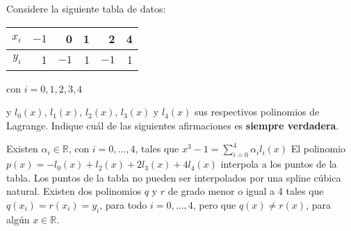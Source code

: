 \begin{pregunta}
\begin{cuerpo}
Considere la siguiente tabla de datos:

\bigskip
\begin{center}
\begin{tabular}{r||r|r|r|r|r}
$x_i$&$-1$&0&1&2&4\\
\hline
$y_i$&1&$-1$&1&$-1$&1
\end{tabular}
\qquad con $i=0,1,2,3,4$
\end{center}
\bigskip

y $l_0(x)$, $l_1(x)$, $l_2(x)$, $l_3(x)$ y $l_4(x)$ sus respectivos polinomios de Lagrange. Indique cu\'al de las siguientes afirmaciones es \textbf{siempre verdadera}.
\end{cuerpo}
\begin{alternativas}
{Existen $\alpha_i\in \mathbb{R}$, con $i=0,\ldots,4$, tales que $x^3-1=\displaystyle \sum_{i=0}^4\alpha_il_i(x)$}
{El polinomio $p(x)=-l_0(x)+l_2(x)+2l_3(x)+4l_4(x)$ interpola a los puntos de la tabla.}
{Los puntos de la tabla no pueden ser interpolados por una spline c\'ubica natural.}
{Existen dos polinomios $q$ y $r$ de grado menor o igual a 4 tales que $q(x_i)=r(x_i)=y_i$, para todo $i=0,\ldots,4$, pero que $q(x)\neq r(x)$, para alg\'un $x\in\mathbb{R}$.}
\end{alternativas}
\justificacion{0cm}
\end{pregunta}